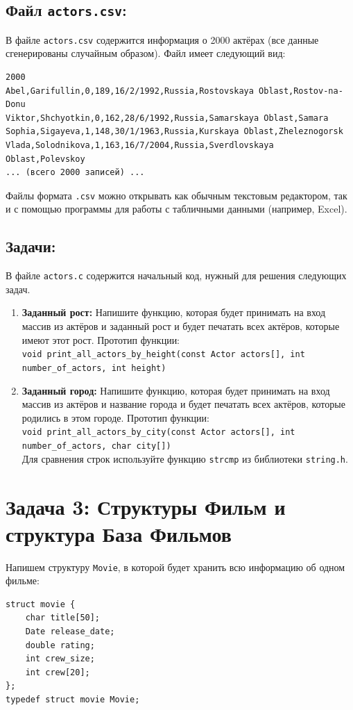 \documentclass{article}
\begin{document}
\subsection*{Файл \texttt{actors.csv}:}
В файле \texttt{actors.csv} содержится информация о 2000 актёрах (все данные сгенерированы случайным образом). Файл имеет следующий вид:
\begin{verbatim}
2000
Abel,Garifullin,0,189,16/2/1992,Russia,Rostovskaya Oblast,Rostov-na-Donu
Viktor,Shchyotkin,0,162,28/6/1992,Russia,Samarskaya Oblast,Samara
Sophia,Sigayeva,1,148,30/1/1963,Russia,Kurskaya Oblast,Zheleznogorsk
Vlada,Solodnikova,1,163,16/7/2004,Russia,Sverdlovskaya Oblast,Polevskoy
... (всего 2000 записей) ...
\end{verbatim}
Файлы формата \texttt{.csv} можно открывать как обычным текстовым редактором, так и с помощью программы для работы с табличными данными (например, Excel). 

\subsection*{Задачи:}
В файле \texttt{actors.c} содержится начальный код, нужный для решения следующих задач.
\begin{enumerate}
\item \textbf{Заданный рост:} Напишите функцию, которая будет принимать на вход массив из актёров и заданный рост и будет печатать всех актёров, которые имеют этот рост. Прототип функции:\\
\texttt{void print\_all\_actors\_by\_height(const Actor actors[], int number\_of\_actors, int height)}
\item \textbf{Заданный город:} Напишите функцию, которая будет принимать на вход массив из актёров и название города и будет печатать всех актёров, которые родились в этом городе. Прототип функции:\\
\texttt{void print\_all\_actors\_by\_city(const Actor actors[], int number\_of\_actors, char city[])}\\
Для сравнения строк используйте функцию \texttt{strcmp} из библиотеки \texttt{string.h}.
\end{enumerate}


\newpage
\section*{Задача 3: Структуры Фильм  и структура База Фильмов}
Напишем структуру \texttt{Movie}, в которой будет хранить всю информацию об одном фильме:
\begin{lstlisting}
struct movie {
    char title[50];
    Date release_date;
    double rating;
    int crew_size;
    int crew[20];
};
typedef struct movie Movie;
\end{lstlisting}
\end{document}
